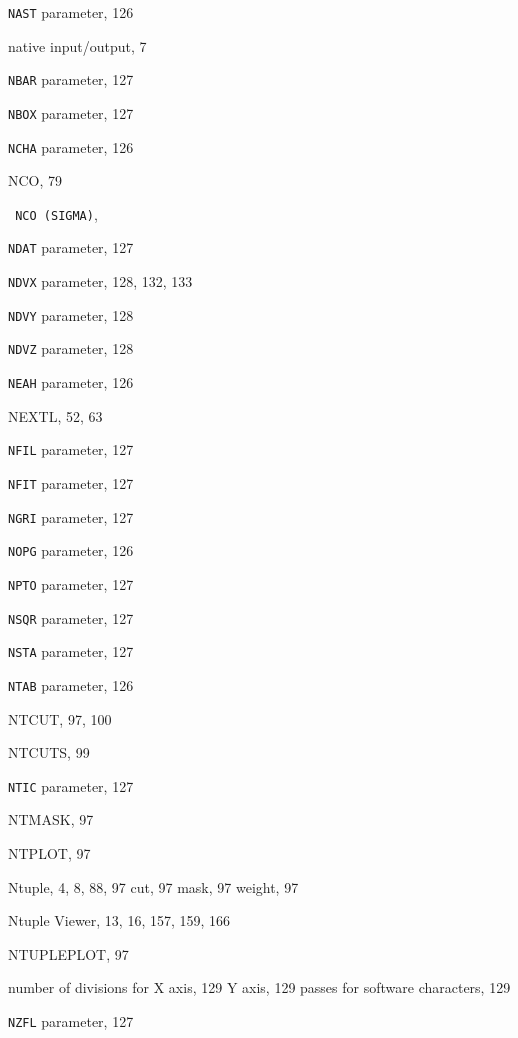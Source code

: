 \begin{theindex}
  \indexspace

  \item {\tt NAST}
     parameter, 126
  \item native input/output, 7
  \item {\tt NBAR}
     parameter, 127
  \item {\tt NBOX}
     parameter, 127
  \item {\tt NCHA}
     parameter, 126
  \item {\ttfamily  NCO}, 79
  \item \texttt  { NCO \textrm  {(SIGMA)}}, 
  \item {\tt NDAT}
     parameter, 127
  \item {\tt NDVX}
     parameter, 128, 132, 133
  \item {\tt NDVY}
     parameter, 128
  \item {\tt NDVZ}
     parameter, 128
  \item {\tt NEAH}
     parameter, 126
  \item {\ttfamily  NEXTL}, 52, 63
  \item {\tt NFIL}
     parameter, 127
  \item {\tt NFIT}
     parameter, 127
  \item {\tt NGRI}
     parameter, 127
  \item {\tt NOPG}
     parameter, 126
  \item {\tt NPTO}
     parameter, 127
  \item {\tt NSQR}
     parameter, 127
  \item {\tt NSTA}
     parameter, 127
  \item {\tt NTAB}
     parameter, 126
  \item {\ttfamily  NTCUT}, 97, 100
  \item {\ttfamily  NTCUTS}, 99
  \item {\tt NTIC}
     parameter, 127
  \item {\ttfamily  NTMASK}, 97
  \item {\ttfamily  NTPLOT}, 97
  \item Ntuple, 4, 8, 88, 97
    \subitem cut, 97
    \subitem mask, 97
    \subitem weight, 97
  \item Ntuple Viewer, 13, 16, 157, 159, 166
  \item {\ttfamily  NTUPLEPLOT}, 97
  \item number of
    \subitem divisions for
      \subsubitem X axis, 129
      \subsubitem Y axis, 129
    \subitem passes for software characters, 129
  \item {\tt NZFL}
     parameter, 127


\end{theindex}
